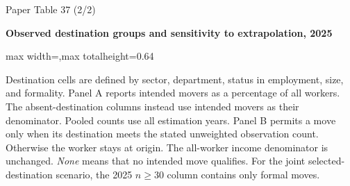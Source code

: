 \begin{frame}{Paper Table 37 (2/2)}
\begin{minipage}{\textwidth}\small\textbf{Observed destination groups and sensitivity to extrapolation, 2025}\end{minipage}\par\vspace{0.15cm}
\centering\begingroup\fontsize{8.5}{10}\selectfont
\setlength{\tabcolsep}{4pt}\renewcommand{\arraystretch}{1.06}
\begin{adjustbox}{max width=\textwidth,max totalheight=0.64\textheight}

\end{adjustbox}\endgroup\par\vspace{0.10cm}
{\fontsize{6.5}{7.5}\selectfont\raggedright Destination cells are defined by sector, department, status in employment, size, and formality. Panel A reports intended movers as a percentage of all workers. The absent-destination columns instead use intended movers as their denominator. Pooled counts use all estimation years. Panel B permits a move only when its destination meets the stated unweighted observation count. Otherwise the worker stays at origin. The all-worker income denominator is unchanged. \textit{None} means that no intended move qualifies. For the joint selected-destination scenario, the 2025 $n\geq30$ column contains only formal moves.\par}
\end{frame}
